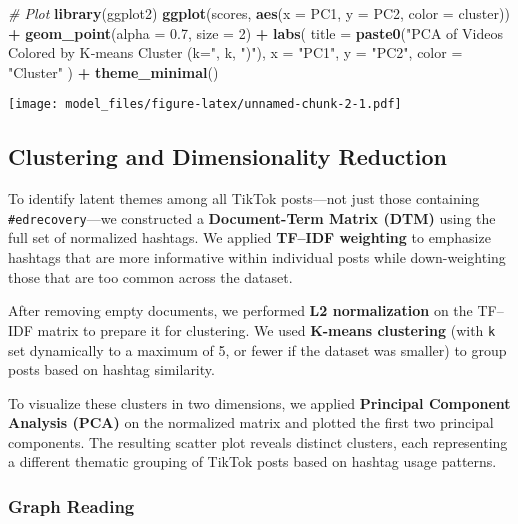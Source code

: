 \documentclass[
]{article}
\newenvironment{Shaded}{\begin{snugshade}}{\end{snugshade}}
\newcommand{\AttributeTok}[1]{\textcolor[rgb]{0.13,0.29,0.53}{#1}}
\newcommand{\CommentTok}[1]{\textcolor[rgb]{0.56,0.35,0.01}{\textit{#1}}}
\newcommand{\DecValTok}[1]{\textcolor[rgb]{0.00,0.00,0.81}{#1}}
\newcommand{\FloatTok}[1]{\textcolor[rgb]{0.00,0.00,0.81}{#1}}
\newcommand{\FunctionTok}[1]{\textcolor[rgb]{0.13,0.29,0.53}{\textbf{#1}}}
\newcommand{\NormalTok}[1]{#1}
\newcommand{\SpecialCharTok}[1]{\textcolor[rgb]{0.81,0.36,0.00}{\textbf{#1}}}
\newcommand{\StringTok}[1]{\textcolor[rgb]{0.31,0.60,0.02}{#1}}
\begin{document}
\begin{Shaded}
\begin{Highlighting}[]
\CommentTok{\# Plot}
\FunctionTok{library}\NormalTok{(ggplot2)}
\FunctionTok{ggplot}\NormalTok{(scores, }\FunctionTok{aes}\NormalTok{(}\AttributeTok{x =}\NormalTok{ PC1, }\AttributeTok{y =}\NormalTok{ PC2, }\AttributeTok{color =}\NormalTok{ cluster)) }\SpecialCharTok{+}
  \FunctionTok{geom\_point}\NormalTok{(}\AttributeTok{alpha =} \FloatTok{0.7}\NormalTok{, }\AttributeTok{size =} \DecValTok{2}\NormalTok{) }\SpecialCharTok{+}
  \FunctionTok{labs}\NormalTok{(}
    \AttributeTok{title =} \FunctionTok{paste0}\NormalTok{(}\StringTok{"PCA of Videos Colored by K‑means Cluster (k="}\NormalTok{, k, }\StringTok{")"}\NormalTok{),}
    \AttributeTok{x =} \StringTok{"PC1"}\NormalTok{, }\AttributeTok{y =} \StringTok{"PC2"}\NormalTok{, }\AttributeTok{color =} \StringTok{"Cluster"}
\NormalTok{  ) }\SpecialCharTok{+}
  \FunctionTok{theme\_minimal}\NormalTok{()}
\end{Highlighting}
\end{Shaded}

\texttt{[image: model\_files/figure-latex/unnamed-chunk-2-1.pdf]}

\subsection{Clustering and Dimensionality
Reduction}\label{clustering-and-dimensionality-reduction}

To identify latent themes among all TikTok posts---not just those
containing \texttt{\#edrecovery}---we constructed a
\textbf{Document-Term Matrix (DTM)} using the full set of normalized
hashtags. We applied \textbf{TF--IDF weighting} to emphasize hashtags
that are more informative within individual posts while down-weighting
those that are too common across the dataset.

After removing empty documents, we performed \textbf{L2 normalization}
on the TF--IDF matrix to prepare it for clustering. We used
\textbf{K-means clustering} (with \texttt{k} set dynamically to a
maximum of 5, or fewer if the dataset was smaller) to group posts based
on hashtag similarity.

To visualize these clusters in two dimensions, we applied
\textbf{Principal Component Analysis (PCA)} on the normalized matrix and
plotted the first two principal components. The resulting scatter plot
reveals distinct clusters, each representing a different thematic
grouping of TikTok posts based on hashtag usage patterns.

\subsubsection{Graph Reading}\label{graph-reading}
\end{document}
